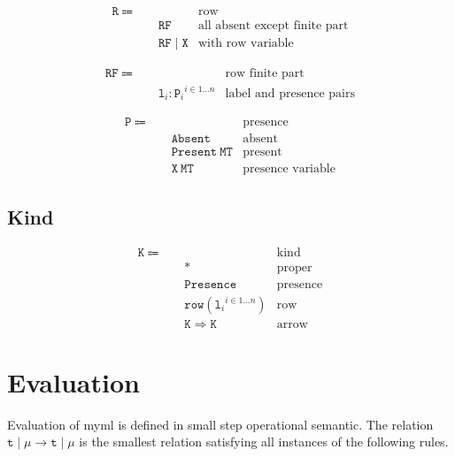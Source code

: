 \documentclass{article}
\newcommand{\theLang}{myml}
\newcommand{\code}{\mathtt}
\begin{document}
\begin{align*}
\code{R} \Coloneqq \quad & & \text{row} \\
& \code{RF} & \text{all absent except finite part} \\
& \code{RF \mid X} & \text{with row variable}
\end{align*}

\begin{align*}
\code{RF} \Coloneqq \quad & & \text{row finite part} \\
& {\code{l}_i : \code{P}_i}^{i \in 1\dots n} & \text{label and presence pairs}
\end{align*}

\begin{align*}
\code{P} \Coloneqq \quad & & \text{presence} \\
& \code{Absent} & \text{absent} \\
& \code{Present\ MT} & \text{present} \\
& \code{X\ MT} & \text{presence variable}
\end{align*}

\subsection{Kind}

\begin{align*}
\code{K} \Coloneqq \quad & & \text{kind} \\
& \code{*} & \text{proper} \\
& \code{Presence} & \text{presence} \\
& \code{row}({\code{l}_i}^{i \in 1\dots n}) & \text{row} \\
& \code{K \Rightarrow K} & \text{arrow}
\end{align*}

\section{Evaluation}

Evaluation of \theLang{} is defined in small step operational semantic. The relation \(\code{t}\mid\mu \longrightarrow \code{t}\mid\mu\) is the smallest relation satisfying all instances of the following rules.
\end{document}
